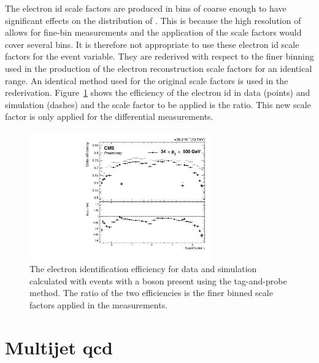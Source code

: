 The electron \acrshort{id} scale factors are produced in bins of \sceta{} coarse enough to have significant effects on the distribution of \LETA{}.
This is because the high resolution of \LETA{} allows for fine-bin measurements and the application of the scale factors would cover several bins.
It is therefore not appropriate to use these electron \acrshort{id} scale factors for the \LETA{} event variable.
They are rederived with respect to the finer binning used in the production of the electron reconstruction scale factors for an identical \pt{} range.
An identical method used for the original scale factors is used in the rederivation.
Figure~\ref{fig:eIDSF} shows the efficiency of the electron \acrshort{id} in data (points) and simulation (dashes) and the scale factor to be applied is the ratio.
This new scale factor is only applied for the \LETA{} differential measurements.
\begin{figure}[htpb]
	\centering
	\includegraphics[width=0.7\textwidth]{Figures/Event_eIDSF.pdf}
	\caption[The electron identification efficiency for data and simulation calculated with events with a \Zboson{} boson present using the tag-and-probe method. The ratio of the two efficiencies is the finer binned scale factors applied in the \LETA{} measurements.]{The electron identification efficiency for data and simulation calculated with events with a \Zboson{} boson present using the tag-and-probe method. The ratio of the two efficiencies is the finer binned scale factors applied in the \LETA{} measurements.}
	\label{fig:eIDSF}
\end{figure}

\section{Multijet \acrshort{qcd}} %
\label{sec:multijet_qcd}

